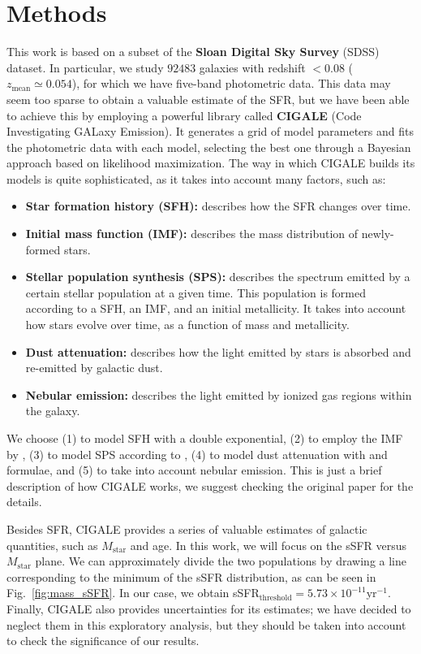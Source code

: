 \documentclass[fleqn,usenatbib]{mnras}
\begin{document}
\section{Methods}\label{sec:methods}
This work is based on a subset of the \textbf{Sloan Digital Sky Survey} (SDSS) dataset. In particular, we study $92483$ galaxies with redshift $< 0.08$ ($z_{\text{mean}} \simeq 0.054$), for which we have five-band photometric data. This data may seem too sparse to obtain a valuable estimate of the SFR, but we have been able to achieve this by employing a powerful library called \textbf{CIGALE} (Code Investigating GALaxy Emission). It generates a grid of model parameters and fits the photometric data with each model, selecting the best one through a Bayesian approach based on likelihood maximization. The way in which CIGALE builds its models is quite sophisticated, as it takes into account many factors, such as:
\begin{itemize}[left=6pt]
    \item \textbf{Star formation history (SFH):} describes how the SFR changes over time.
    \item \textbf{Initial mass function (IMF):} describes the mass distribution of newly-formed stars.
    \item \textbf{Stellar population synthesis (SPS):} describes the spectrum emitted by a certain stellar population at a given time. This population is formed according to a SFH, an IMF, and an initial metallicity. It takes into account how stars evolve over time, as a function of mass and metallicity.
    \item \textbf{Dust attenuation:} describes how the light emitted by stars is absorbed and re-emitted by galactic dust.
    \item \textbf{Nebular emission:} describes the light emitted by ionized gas regions within the galaxy.
\end{itemize}
We choose (1) to model SFH with a double exponential, (2) to employ the IMF by \citet{Chabrier_2003}, (3) to model SPS according to \citet{Bruzual_2003}, (4) to model dust attenuation with \citet{Calzetti_2000} and \citet{Leitherer_2002} formulae, and (5) to take into account nebular emission. This is just a brief description of how CIGALE works, we suggest checking the original paper \citep{Boquien_2019} for the details.

Besides SFR, CIGALE provides a series of valuable estimates of galactic quantities, such as $M_{\text{star}}$ and age. In this work, we will focus on the sSFR versus $M_{\text{star}}$ plane. We can approximately divide the two populations by drawing a line corresponding to the minimum of the sSFR distribution, as can be seen in Fig.~\ref{fig:mass_sSFR}. In our case, we obtain sSFR$_{\text{threshold}} = 5.73 \times 10^{-11} \text{yr}^{-1}$. Finally, CIGALE also provides uncertainties for its estimates; we have decided to neglect them in this exploratory analysis, but they should be taken into account to check the significance of our results.
\end{document}
